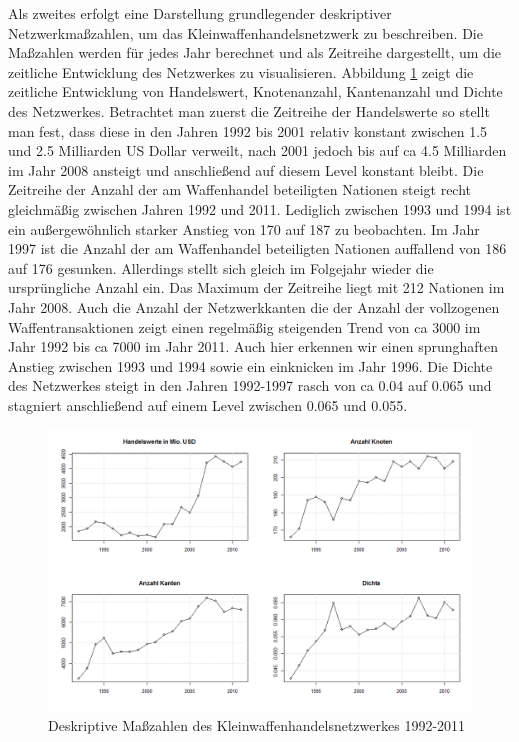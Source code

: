 \documentclass[a4paper,ngerman,oneside,titlepage,bibliography=totoc,11pt]{scrreprt}
\begin{document}
Als zweites erfolgt eine Darstellung grundlegender deskriptiver Netzwerkmaßzahlen, um das Kleinwaffenhandelsnetzwerk zu beschreiben. Die Maßzahlen werden für jedes Jahr berechnet und als Zeitreihe dargestellt, um die zeitliche Entwicklung des Netzwerkes zu visualisieren. 
Abbildung \ref{fig:ts_descriptives} zeigt die zeitliche Entwicklung  von Handelswert, Knotenanzahl, Kantenanzahl und Dichte des Netzwerkes. Betrachtet man zuerst die Zeitreihe der Handelswerte so stellt man fest, dass diese in den Jahren 1992 bis 2001 relativ konstant zwischen 1.5 und 2.5 Milliarden US Dollar verweilt, nach 2001 jedoch bis auf ca 4.5 Milliarden im Jahr 2008 ansteigt und anschließend auf diesem Level konstant bleibt.
Die Zeitreihe der Anzahl der am Waffenhandel beteiligten Nationen steigt recht gleichmäßig zwischen Jahren 1992 und 2011. Lediglich zwischen 1993 und 1994 ist ein außergewöhnlich starker Anstieg von 170 auf 187 zu beobachten. Im Jahr 1997 ist die Anzahl der am Waffenhandel beteiligten Nationen auffallend von 186 auf 176 gesunken. Allerdings stellt sich gleich im Folgejahr wieder die ursprüngliche Anzahl ein. Das Maximum der Zeitreihe liegt mit 212 Nationen im Jahr 2008.
Auch die Anzahl der Netzwerkkanten die der Anzahl der vollzogenen Waffentransaktionen zeigt einen regelmäßig steigenden Trend von ca 3000 im Jahr 1992 bis ca 7000 im Jahr 2011. Auch hier erkennen wir einen sprunghaften Anstieg zwischen 1993 und 1994 sowie ein einknicken im Jahr 1996.
Die Dichte des Netzwerkes steigt in den Jahren 1992-1997 rasch von ca 0.04 auf 0.065 und stagniert anschließend auf einem Level zwischen 0.065 und 0.055.
\begin{figure}[h]
	\centering
		\includegraphics[width=1.00\textwidth]{Grafiken/ts_descriptives.png}
	\caption{Deskriptive Maßzahlen des Kleinwaffenhandelsnetzwerkes 1992-2011}
	\label{fig:ts_descriptives}
\end{figure}
\end{document}
